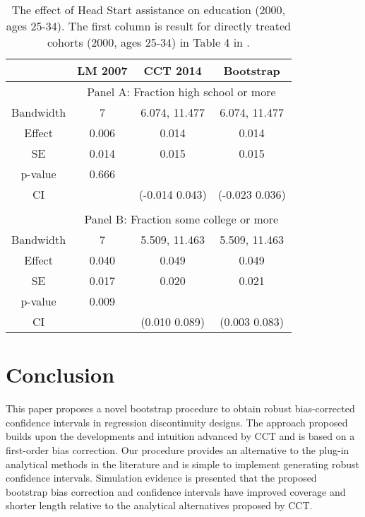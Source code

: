 \documentclass[12pt,fleqn]{article}
\begin{document}
\begin{table}[ht]
	\centering
	\begin{tabular}{cccc}
		\toprule
		& LM 2007 & CCT 2014 & Bootstrap \\
		\midrule
		& \multicolumn{3}{c}{Panel A: Fraction high school or more} \\ 
		Bandwidth & 7 & 6.074, 11.477 & 6.074, 11.477 \\
		Effect    & 0.006 & 0.014 & 0.014 \\
		SE        & 0.014 & 0.015 & 0.015 \\
		p-value   & 0.666 & & \\
		CI        & & (-0.014 0.043) & (-0.023 0.036) \\
		
		&&& \\
		& \multicolumn{3}{c}{Panel B: Fraction some college or more} \\
		Bandwidth & 7 & 5.509, 11.463 & 5.509, 11.463 \\
		Effect    & 0.040 & 0.049 & 0.049 \\
		SE        & 0.017 & 0.020 & 0.021 \\ 
		p-value   & 0.009 & & \\
		CI        & & (0.010 0.089) & (0.003 0.083) \\
		\bottomrule
	\end{tabular}
	\caption{The effect of Head Start assistance on education (2000, ages 25-34). The first column is result for directly treated cohorts (2000, ages 25-34) in Table 4 in \cite{ludwig2007}.}
	\label{tab: education 2000 ages 25-34}
\end{table}

\section{Conclusion}\label{conclusion}
This paper proposes a novel bootstrap procedure to obtain robust bias-corrected
confidence intervals in regression discontinuity designs. 
The approach proposed builds upon the developments and intuition advanced by CCT and is based on a first-order bias correction.
Our procedure provides an alternative to the plug-in analytical methods in the literature and is simple to implement generating robust confidence intervals.
Simulation evidence is presented that the proposed bootstrap bias correction and confidence intervals have improved coverage and shorter length relative to the analytical alternatives proposed by CCT.
\end{document}
